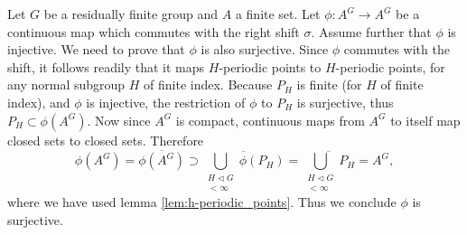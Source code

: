 Let $G$ be a residually finite group and $A$ a finite set. Let $\phi: A^G \to A^G$ be a continuous map which commutes with the right shift $\sigma$. Assume further that $\phi$ is injective. We need to prove that $\phi$ is also surjective. Since $\phi$ commutes with the shift, it follows readily that it maps $H$-periodic points to $H$-periodic points, for any normal subgroup $H$ of finite index.
Because $P_H$ is finite (for $H$ of finite index), and $\phi$ is injective, the restriction of $\phi$ to $P_H$ is surjective, thus $P_H \subset \phi(A^G)$. Now since $A^G$ is compact, continuous maps from $A^G$ to itself map closed sets to closed sets. Therefore
\[
\phi(A^G) = \overline{\phi(A^G)} \supset
\overline{\bigcup_{\substack{H \triangleleft G \\ [G : H] < \infty}}\phi( P_H)}
= \overline{\bigcup_{\substack{H \triangleleft G \\ [G : H] < \infty}} P_H} = A^G,
\]
where we have used lemma \ref{lem:h-periodic_points}. Thus we conclude $\phi$ is surjective.
